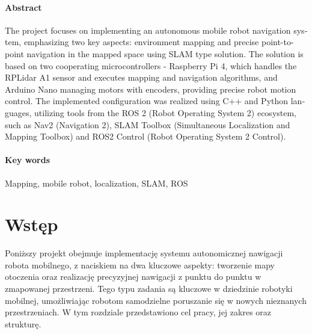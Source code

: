 \documentclass[a4paper,twoside,12pt]{book}
\newcounter{stronyPozaNumeracja}
\begin{document}
\subsubsection*{Abstract} 
\begin{otherlanguage}{british}
The project focuses on implementing an autonomous mobile robot navigation system, emphasizing two key aspects: environment mapping and precise point-to-point navigation in the mapped space using SLAM type solution. The solution is based on two cooperating microcontrollers - Raspberry Pi 4, which handles the RPLidar A1 sensor and executes mapping and navigation algorithms, and Arduino Nano managing motors with encoders, providing precise robot motion control. The implemented configuration was realized using C++ and Python languages, utilizing tools from the ROS 2 (Robot Operating System 2) ecosystem, such as Nav2 (Navigation 2), SLAM Toolbox (Simultaneous Localization and Mapping Toolbox) and ROS2 Control (Robot Operating System 2 Control).

\end{otherlanguage}
\subsubsection*{Key words}  
\begin{otherlanguage}{british}
Mapping, mobile robot, localization, SLAM, ROS
\end{otherlanguage}




\tableofcontents

\setcounter{stronyPozaNumeracja}{\value{page}}
\mainmatter
\pagestyle{empty}

\cleardoublepage

\pagestyle{NumeryStronNazwyRozdzialow}


\chapter{Wstęp}
\label{ch:wstep}
Poniższy projekt obejmuje implementację systemu autonomicznej nawigacji robota mobilnego, z naciskiem na dwa kluczowe aspekty: tworzenie mapy otoczenia oraz realizację precyzyjnej nawigacji z punktu do punktu w zmapowanej przestrzeni. Tego typu zadania są kluczowe w dziedzinie robotyki mobilnej, umożliwiając robotom samodzielne poruszanie się w nowych nieznanych przestrzeniach.
W tym rozdziale przedstawiono cel pracy, jej zakres oraz strukturę.
\end{document}
